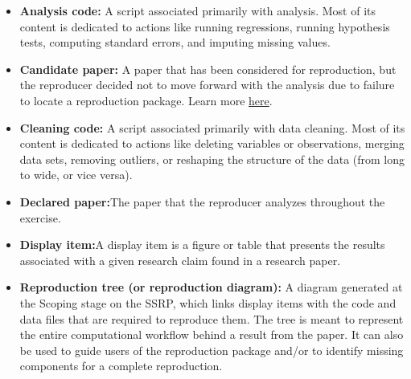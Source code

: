 \documentclass[
]{book}
\providecommand{\tightlist}{%
  \setlength{\itemsep}{0pt}\setlength{\parskip}{0pt}}
\begin{document}
\begin{itemize}
\tightlist
\item
  \textbf{Analysis code:} A script associated primarily with analysis. Most of its content is dedicated to actions like running regressions, running hypothesis tests, computing standard errors, and imputing missing values.\\
\item
  \textbf{Candidate paper:} A paper that has been considered for reproduction, but the reproducer decided not to move forward with the analysis due to failure to locate a reproduction package. Learn more \href{https://bitss.github.io/ACRE/scoping.html\#from-candidate-to-declared-paper}{here}.
\item
  \textbf{Cleaning code:} A script associated primarily with data cleaning. Most of its content is dedicated to actions like deleting variables or observations, merging data sets, removing outliers, or reshaping the structure of the data (from long to wide, or vice versa).\\
\item
  \textbf{Declared paper:}The paper that the reproducer analyzes throughout the exercise.
\item
  \textbf{Display item:}A display item is a figure or table that presents the results associated with a given research claim found in a research paper.
\item
  \textbf{Reproduction tree (or reproduction diagram):} A diagram generated at the Scoping stage on the SSRP, which links display items with the code and data files that are required to reproduce them. The tree is meant to represent the entire computational workflow behind a result from the paper. It can also be used to guide users of the reproduction package and/or to identify missing components for a complete reproduction.
\end{itemize}

  
\end{document}
